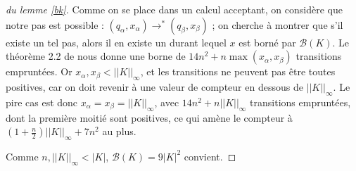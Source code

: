 \documentclass[12pt, a4paper]{article}
\newcommand{\Kinf}{||K||_{\infty}}
\begin{document}
\begin{proof}[du lemme \ref{bk}]
        Comme on se place dans un calcul acceptant, on considère que notre pas est possible : $(q_\alpha,x_\alpha) \rightarrow^* (q_\beta,x_\beta)$ ; on cherche à montrer que s'il existe un tel pas, alors il en existe un durant lequel $x$ est borné par $\mathcal{B}(K)$.
        Le théorème 2.2 de \cite{shortpathOCS} nous donne une borne de $14n^2 + n \max (x_\alpha,x_\beta)$ transitions empruntées. Or $x_\alpha,x_\beta < \Kinf$, et les transitions ne peuvent pas être toutes positives, car on doit revenir à une valeur de compteur en dessous de $\Kinf$. Le pire cas est donc $x_\alpha = x_\beta = \Kinf$, avec $14n^2+n\Kinf$ transitions empruntées, dont la première moitié sont positives, ce qui amène le compteur à $(1+\frac{n}{2})\Kinf + 7n^2$ au plus.
        
        Comme $n,\Kinf < |K|$, $\mathcal{B}(K) = 9|K|^2$ convient.
       
    \end{proof}
\end{document}
